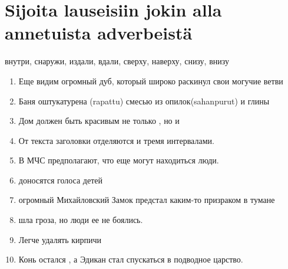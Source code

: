 \documentclass[paper=a4, fontsize=11pt]{scrartcl}
\begin{document}
\section{Sijoita lauseisiin jokin alla annetuista adverbeistä}

внутри, снаружи, издали, вдали, сверху, наверху, снизу, внизу

\begin{enumerate}

    \item 	Еще \raisebox{-0.1cm}{\shortstack{\underline{\hspace{3cm}}}}  видим огромный дуб, который широко раскинул свои могучие ветви
    \item 	Баня \raisebox{-0.1cm}{\shortstack{\underline{\hspace{3cm}}}} оштукатурена (rapattu) смесью из опилок(sahanpurut) и глины
    \item 	Дом должен быть красивым не только \raisebox{-0.1cm}{\shortstack{\underline{\hspace{3cm}}}} , но и \raisebox{-0.1cm}{\shortstack{\underline{\hspace{3cm}}}} 
    \item  	От текста заголовки отделяются \raisebox{-0.1cm}{\shortstack{\underline{\hspace{3cm}}}}  и \raisebox{-0.1cm}{\shortstack{\underline{\hspace{3cm}}}}  тремя интервалами.
    \item 	В МЧС предполагают, что \raisebox{-0.1cm}{\shortstack{\underline{\hspace{3cm}}}}  еще могут находиться люди.
    \item 	\raisebox{-0.1cm}{\shortstack{\underline{\hspace{3cm}}}}  доносятся голоса детей
    \item  	\raisebox{-0.1cm}{\shortstack{\underline{\hspace{3cm}}}} огромный Михайловский Замок предстал каким-то призраком в тумане
    \item 	\raisebox{-0.1cm}{\shortstack{\underline{\hspace{3cm}}}}  шла гроза, но люди ее не боялись.
    \item 	Легче удалять кирпичи \raisebox{-0.1cm}{\shortstack{\underline{\hspace{3cm}}}} 
    \item  Конь остался \raisebox{-0.1cm}{\shortstack{\underline{\hspace{3cm}}}}, а Эдикан стал спускаться в подводное царство.


\end{enumerate}
\end{document}
